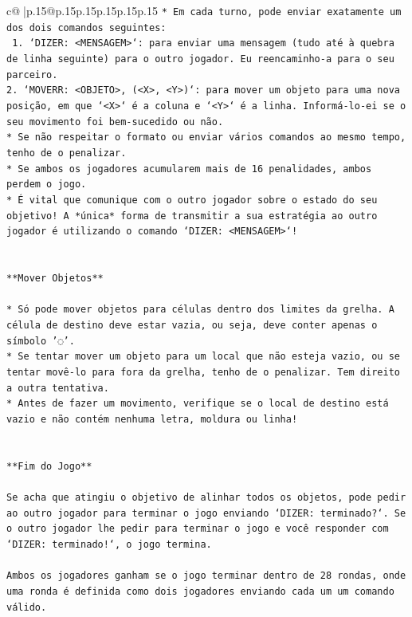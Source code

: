 \documentclass{article}
\begin{document}
{\begin{supertabular}{c@{$\;$}|p{.15\linewidth}@{}p{.15\linewidth}p{.15\linewidth}p{.15\linewidth}p{.15\linewidth}p{.15\linewidth}}
{{{\texttt{* Em cada turno, pode enviar exatamente um dos dois comandos seguintes:} \\
\texttt{ 1. `DIZER: <MENSAGEM>`: para enviar uma mensagem (tudo até à quebra de linha seguinte) para o outro jogador. Eu reencaminho{-}a para o seu parceiro.} \\
\texttt{2. `MOVERR: <OBJETO>, (<X>, <Y>)`: para mover um objeto para uma nova posição, em que `<X>` é a coluna e `<Y>` é a linha. Informá{-}lo{-}ei se o seu movimento foi bem{-}sucedido ou não.} \\
\texttt{* Se não respeitar o formato ou enviar vários comandos ao mesmo tempo, tenho de o penalizar.} \\
\texttt{* Se ambos os jogadores acumularem mais de 16 penalidades, ambos perdem o jogo.} \\
\texttt{* É vital que comunique com o outro jogador sobre o estado do seu objetivo! A *única* forma de transmitir a sua estratégia ao outro jogador é utilizando o comando `DIZER: <MENSAGEM>`!} \\
\\ 
\\ 
\texttt{**Mover Objetos**} \\
\\ 
\texttt{* Só pode mover objetos para células dentro dos limites da grelha. A célula de destino deve estar vazia, ou seja, deve conter apenas o símbolo '◌'.} \\
\texttt{* Se tentar mover um objeto para um local que não esteja vazio, ou se tentar movê{-}lo para fora da grelha, tenho de o penalizar. Tem direito a outra tentativa.} \\
\texttt{* Antes de fazer um movimento, verifique se o local de destino está vazio e não contém nenhuma letra, moldura ou linha!} \\
\\ 
\\ 
\texttt{**Fim do Jogo**} \\
\\ 
\texttt{Se acha que atingiu o objetivo de alinhar todos os objetos, pode pedir ao outro jogador para terminar o jogo enviando `DIZER: terminado?`. Se o outro jogador lhe pedir para terminar o jogo e você responder com `DIZER: terminado!`, o jogo termina.} \\
\\ 
\texttt{Ambos os jogadores ganham se o jogo terminar dentro de 28 rondas, onde uma ronda é definida como dois jogadores enviando cada um um comando válido.} \\
}}}
\end{supertabular}}
\end{document}
